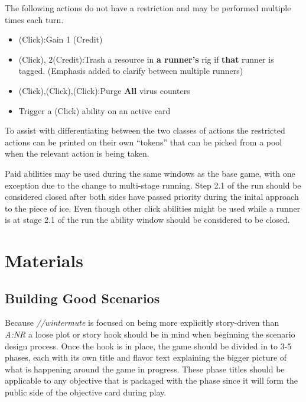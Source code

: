 \documentclass[titlepage]{article}
\begin{document}
			The following actions do not have a restriction and may be performed multiple times each turn.

			\begin{itemize}

				\item (Click):Gain 1 (Credit)

				\item (Click), 2(Credit):Trash a resource in \textbf{a runner's} rig if \textbf{that} runner is tagged. (Emphasis added to clarify between multiple runners)

				\item (Click),(Click),(Click):Purge \textbf{All} virus counters

				\item Trigger a (Click) ability on an active card

			\end{itemize}

			To assist with differentiating between the two classes of actions the restricted actions can be printed on their own ``tokens'' that can be picked from a pool when the relevant action is being taken.

			Paid abilities may be used during the same windows as the base game, with one exception due to the change to multi-stage running. Step 2.1 of the run should be considered closed after both sides have passed priority during the inital approach to the piece of ice. Even though other click abilities might be used while a runner is at stage 2.1 of the run the ability window should be considered to be closed.

\section{Materials}

	\subsection{Building Good Scenarios}

		Because \emph{//wintermute} is focused on being more explicitly story-driven than \emph{A:NR} a loose plot or story hook should be in mind when beginning the scenario design process. Once the hook is in place, the game should be divided in to 3-5 phases, each with its own title and flavor text explaining the bigger picture of what is happening around the game in progress. These phase titles should be applicable to any objective that is packaged with the phase since it will form the public side of the objective card during play.
\end{document}
